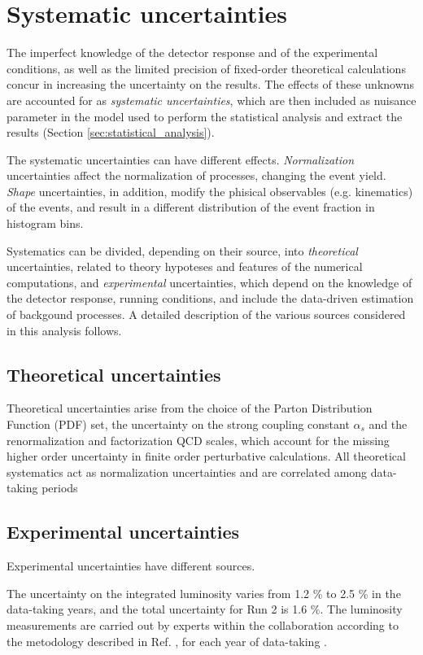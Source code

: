 \section{Systematic uncertainties}
The imperfect knowledge of the detector response and of the experimental conditions, as well as the limited precision of fixed-order theoretical calculations concur in increasing the uncertainty on the results.
The effects of these unknowns are accounted for as \textit{systematic uncertainties}, which are then included as nuisance parameter in the model used to perform the statistical analysis and extract the results (Section \ref{sec:statistical_analysis}).

The systematic uncertainties can have different effects.
\textit{Normalization} uncertainties affect the normalization of processes, changing the event yield.
\textit{Shape} uncertainties, in addition, modify the phisical observables (e.g. kinematics) of the events, and result in a different distribution of the event fraction in histogram bins.

Systematics can be divided, depending on their source, into \textit{theoretical} uncertainties, related to theory hypoteses and features of the numerical computations, and \textit{experimental} uncertainties, which depend on the knowledge of the detector response, running conditions, and include the data-driven estimation of backgound processes.
A detailed description of the various sources considered in this analysis follows.

\subsection{Theoretical uncertainties}
Theoretical uncertainties arise from the choice of the Parton Distribution Function (PDF) set,
the uncertainty on the strong coupling constant $\alpha_s$ and
the renormalization and factorization QCD scales, which account for the missing higher order uncertainty in finite order perturbative calculations.
All theoretical systematics act as normalization uncertainties and are correlated among data-taking periods

\subsection{Experimental uncertainties}
Experimental uncertainties have different sources.

The uncertainty on the integrated luminosity varies from 1.2 \% to 2.5 \% in the data-taking years, and the total uncertainty for Run 2 is 1.6 \%.
The luminosity measurements are carried out by experts within the collaboration according to the metodology described in Ref. \cite{CMS:LUM-17-003}, for each year of data-taking \cite{CMS:LUM-17-004, CMS:LUM-18-002}.


